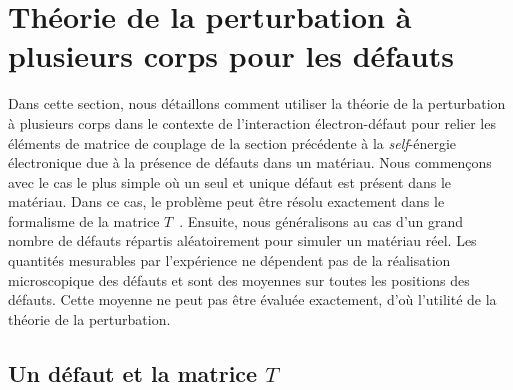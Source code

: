 \section{Théorie de la perturbation à plusieurs corps pour les défauts}\label{sec:mbt_défaut}
Dans cette section, nous détaillons comment utiliser la théorie de la perturbation à plusieurs corps dans le contexte de l'interaction électron-défaut pour relier les éléments de matrice de couplage de la section précédente à la \textit{self}-énergie électronique due à la présence de défauts dans un matériau. Nous commençons avec le cas le plus simple où un seul et unique défaut est présent dans le matériau. Dans ce cas, le problème peut être résolu exactement dans le formalisme de la matrice $T$~\cite{bruusManyBodyQuantumTheory2004}. Ensuite, nous généralisons au cas d'un grand nombre de défauts répartis aléatoirement pour simuler un matériau réel. Les quantités mesurables par l'expérience ne dépendent pas de la réalisation microscopique des défauts et sont des moyennes sur toutes les positions des défauts. Cette moyenne ne peut pas être évaluée exactement, d'où l'utilité de la théorie de la perturbation.

\subsection{Un défaut et la matrice $T$}\label{sec:mbt_T}

